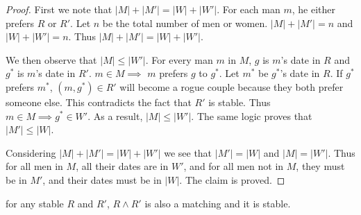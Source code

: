 \documentclass[11pt]{article}
\begin{document}
\begin{Parts}
\begin{Answer}
\begin{proof}
                First we note that $|M|+|M'|=|W|+|W'|$. For each man $m$, he either prefers $R$ or $R'$. Let $n$ be the total number 
                of men or women. $|M|+|M'|=n$ and $|W|+|W'|=n$. Thus $|M|+|M'|=|W|+|W'|$.

                We then observe that $|M|\leq|W'|$. For every man $m$ in $M$, $g$ is $m$'s date in $R$ and $g^*$ is $m$'s date in $R'$. 
                $m \in M \implies$ $m$ prefers $g$ to $g^*$. Let $m^*$ be $g^*$'s date in $R$. If $g^*$ prefers $m^*$, $(m,g^*)\in R'$ 
                will become a rogue couple because they both prefer someone else. This contradicts the fact that $R'$ is stable. Thus 
                $m \in M \implies g^* \in W'$. As a result, $|M|\leq|W'|$. The same logic proves that $|M'|\leq|W|$.

                Considering $|M|+|M'|=|W|+|W'|$ we see that $|M'|=|W|$ and $|M|=|W'|$. Thus for all men in $M$, all their dates are in 
                $W'$, and for all men not in $M$, they must be in $M'$, and their dates must be in $|W|$. The claim is proved. 
            \end{proof}
        \end{Answer}

        \Part for any stable $R$ and $R'$, $R \land R'$ is also a matching and it is stable.


\end{Parts}
\end{document}
